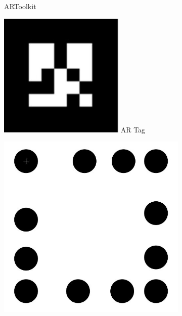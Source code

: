 \documentclass[runningheads]{llncs}
\begin{document}
\begin{figure}
\begin{subfigure}[b]{0.14\textwidth}
  ARToolkit\cite{ARToolkit02}
 \end{subfigure}\quad
 \begin{subfigure}[b]{0.14\textwidth}
  \centering
  \includegraphics[width=\linewidth]{ARtag.jpg}
  AR Tag\quad\cite{Fiala05}
 \end{subfigure}\quad
 \begin{subfigure}[b]{0.14\textwidth}
  \centering
  \includegraphics[width=\linewidth]{pifiducial.jpg}

\end{subfigure}
\end{figure}
\end{document}
